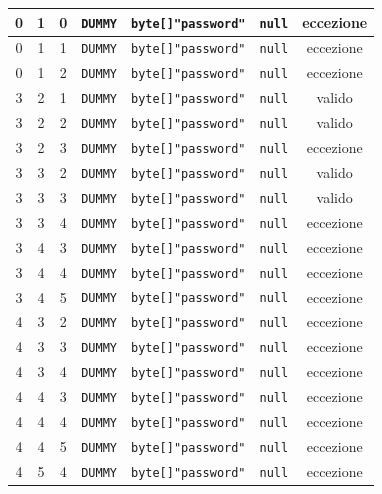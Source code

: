 \documentclass[10pt]{article}
\begin{document}
{\begin{table}[h]
\begin{tabular}{|c|c|c|c|c|c|c|}
				\hline
				0 & 1 & 0 & \texttt{DUMMY} & \texttt{byte[]{"password"}} & \texttt{null} & eccezione \\
				\hline
				0 & 1 & 1 & \texttt{DUMMY} & \texttt{byte[]{"password"}} & \texttt{null} & eccezione \\
				\hline
				0 & 1 & 2 & \texttt{DUMMY} & \texttt{byte[]{"password"}} & \texttt{null} & eccezione \\
				\hline
				3 & 2 & 1 & \texttt{DUMMY} & \texttt{byte[]{"password"}} & \texttt{null} & valido \\
				\hline
				3 & 2 & 2 & \texttt{DUMMY} & \texttt{byte[]{"password"}} & \texttt{null} & valido \\
				\hline
				3 & 2 & 3 & \texttt{DUMMY} & \texttt{byte[]{"password"}} & \texttt{null} & eccezione \\
				\hline
				3 & 3 & 2 & \texttt{DUMMY} & \texttt{byte[]{"password"}} & \texttt{null} & valido \\
				\hline
				3 & 3 & 3 & \texttt{DUMMY} & \texttt{byte[]{"password"}} & \texttt{null} & valido \\
				\hline
				3 & 3 & 4 & \texttt{DUMMY} & \texttt{byte[]{"password"}} & \texttt{null} & eccezione \\
				\hline
				3 & 4 & 3 & \texttt{DUMMY} & \texttt{byte[]{"password"}} & \texttt{null} & eccezione \\
				\hline
				3 & 4 & 4 & \texttt{DUMMY} & \texttt{byte[]{"password"}} & \texttt{null} & eccezione \\
				\hline
				3 & 4 & 5 & \texttt{DUMMY} & \texttt{byte[]{"password"}} & \texttt{null} & eccezione \\
				\hline
				4 & 3 & 2 & \texttt{DUMMY} & \texttt{byte[]{"password"}} & \texttt{null} & eccezione \\
				\hline
				4 & 3 & 3 & \texttt{DUMMY} & \texttt{byte[]{"password"}} & \texttt{null} & eccezione \\
				\hline
				4 & 3 & 4 & \texttt{DUMMY} & \texttt{byte[]{"password"}} & \texttt{null} & eccezione \\
				\hline
				4 & 4 & 3 & \texttt{DUMMY} & \texttt{byte[]{"password"}} & \texttt{null} & eccezione \\
				\hline
				4 & 4 & 4 & \texttt{DUMMY} & \texttt{byte[]{"password"}} & \texttt{null} & eccezione \\
				\hline
				4 & 4 & 5 & \texttt{DUMMY} & \texttt{byte[]{"password"}} & \texttt{null} & eccezione \\
				\hline
				4 & 5 & 4 & \texttt{DUMMY} & \texttt{byte[]{"password"}} & \texttt{null} & eccezione \\

\end{tabular}
\end{table}}
\end{document}
